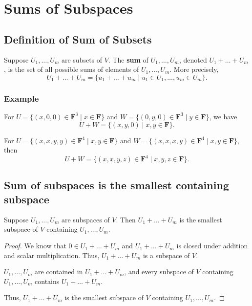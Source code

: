 \documentclass[11pt]{article}
\begin{document}
    \section{Sums of Subspaces}

    \subsection{Definition of Sum of Subsets}

    Suppose \(U_1, \dots, U_m\) are subsets of $V$. The \textbf{sum} of \(U_1, \dots, U_m\), denoted \(U_1 + \dots + U_m\), is the set of all possible sums of elements of \(U_1, \dots, U_m\). More precisely, \[U_1 + \dots + U_m = \{u_1 + \dots + u_m \mid u_1 \in U_1, \dots, u_m \in U_m\}.\]

    \subsubsection{Example}

    For \(U = \{(x,0,0) \in \textbf{F}^3 \mid x \in \textbf{F}\}\) and \(W = \{(0,y,0) \in \textbf{F}^3 \mid y \in \textbf{F}\}\), we have \[U + W = \{(x,y,0) \mid x,y \in \textbf{F}\}.\]

    For \(U = \{(x,x,y,y) \in \textbf{F}^4 \mid x,y \in \textbf{F}\}\) and \(W = \{(x,x,x,y) \in \textbf{F}^4 \mid x,y \in \textbf{F}\}\), then \[U + W = \{(x,x,y,z) \in \textbf{F}^4 \mid x,y,z \in \textbf{F}\}.\]

    \subsection{Sum of subspaces is the smallest containing subspace}

    Suppose \(U_1, \dots, U_m\) are subspaces of $V$. Then \(U_1 + \dots + U_m\) is the smallest subspace of $V$ containing \(U_1, \dots, U_m\).

    \begin{proof}
        We know that \(0 \in U_1 + \dots + U_m\) and \( U_1 + \dots + U_m \) is closed under addition and scalar multiplication. Thus, \(U_1 + \dots + U_m\) is a subspace of $V$.

        \(U_1, \dots, U_m\) are contained in \(U_1 + \dots + U_m\), and every subspace of $V$ containing \(U_1, \dots, U_m\) contains \(U_1 + \dots + U_m\).

        Thus, \(U_1 + \dots + U_m\) is the smallest subspace of $V$ containing \(U_1, \dots, U_m\).
    \end{proof}
\end{document}
